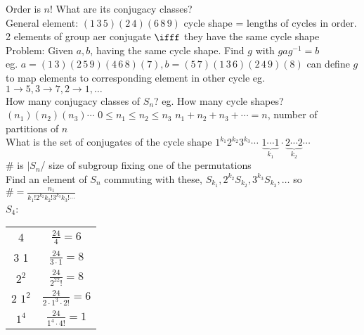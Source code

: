 Order is $n!$ What are its conjugacy classes? \\
General element: $(1 \, 3 \, 5)(2 \, 4)(6 \, 8 \, 9)$ \quad cycle shape = lengths of cycles in order. \\
2 elements of group aer conjugate $\ifff$ they have the same cycle shape \\
Problem: Given $a,b$, having the same cycle shape. Find $g$ with $gag^{-1}=b$ \\
eg. $a=(1 \, 3)(2 \, 5 \, 9)(4 \, 6 \, 8)(7), b = (5 \, 7)(1 \, 3 \, 6)(2 \, 4 \, 9)(8)$ can define $g$ to map elements to corresponding element in other cycle eg. $1 \to 5, 3 \to 7, 2 \to 1, \ldots$ \\
How many conjugacy classes of $S_n$? eg. How many cycle shapes? \\
$(n_1)(n_2)(n_3) \cdots$ $0 \le n_1 \le n_2 \le n_3$ $n_1 + n_2 + n_3 + \cdots =n$, number of partitions of $n$ \\ 
What is the set of conjugates of the cycle shape $1^{k_1}2^{k_2}3^{k_3} \cdots$ $\underbrace{1 \cdots 1}_{k_1} \cdot \underbrace{2 \cdots 2}_{k_2} \cdots$ \\
\# is $|S_n$/ size of subgroup fixing one of the permutations \\
Find an element of $S_n$ commuting with these, $S_{k_1}, 2^{k_2}S_{k_2}, 3^{k_3}S_{k_3}, \ldots$ so $\# = \frac{n_1}{k_1!2^{k_2}k_2!3^{k_3}k_3! \cdots}$ \\
 $S_4$: \\
 \begin{tabular}{c c}
    4 & $\frac{24}{4}=6$ \\
    3 1 & $\frac{24}{3 \cdot 1}=8$ \\
    $2^2$ & $\frac{24}{2^22!}=8$ \\
    2 $1^2$ & $\frac{24}{2 \cdot 1^3 \cdot 2!}=6$ \\
    $1^4$ & $\frac{24}{1^4 \cdot 4!}=1$ 
 \end{tabular}

